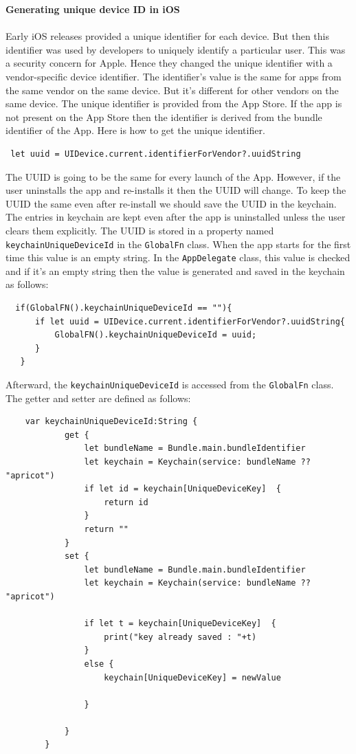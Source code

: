 \documentclass[12pt, conference, a4paper]{article}
\begin{document}
\textbf{Generating unique device ID in iOS\\}\\
Early iOS releases provided a unique identifier for each device. But then this identifier was used by developers to uniquely identify a particular user. This was a security concern for Apple. Hence they changed the unique identifier with a vendor-specific device identifier. The identifier’s value is the same for apps from the same vendor on the same device. But it’s different for other vendors on the same device. The unique identifier is provided from the App Store. If the app is not present on the App Store then the identifier is derived from the bundle identifier of the App. 
Here is how to get the unique identifier. 
\begin{verbatim}
 let uuid = UIDevice.current.identifierForVendor?.uuidString   
\end{verbatim}
The UUID is going to be the same for every launch of the App. However, if the user uninstalls the app and re-installs it then the UUID will change. To keep the UUID the same even after re-install we should save the UUID in the keychain. The entries in keychain are kept even after the app is uninstalled unless the user clears them explicitly. The UUID is stored in a property named \texttt{keychainUniqueDeviceId} in the \texttt{GlobalFn} class. When the app starts for the first time this value is an empty string. In the \texttt{AppDelegate} class, this value is checked and if it’s an empty string then the value is generated and saved in the keychain as follows: 
\begin{verbatim}
  if(GlobalFN().keychainUniqueDeviceId == ""){
      if let uuid = UIDevice.current.identifierForVendor?.uuidString{
          GlobalFN().keychainUniqueDeviceId = uuid;
      }
   }
\end{verbatim}
Afterward, the \texttt{keychainUniqueDeviceId} is accessed from the \texttt{GlobalFn} class. The getter and setter are defined as follows:
\newpage
\begin{verbatim}
    var keychainUniqueDeviceId:String {
            get {
                let bundleName = Bundle.main.bundleIdentifier
                let keychain = Keychain(service: bundleName ?? "apricot")
                if let id = keychain[UniqueDeviceKey]  {
                    return id
                }
                return ""
            }
            set {
                let bundleName = Bundle.main.bundleIdentifier
                let keychain = Keychain(service: bundleName ?? "apricot")
  
                if let t = keychain[UniqueDeviceKey]  {
                    print("key already saved : "+t)
                }
                else {
                    keychain[UniqueDeviceKey] = newValue
  
                }
                
            }
        }
\end{verbatim}
\end{document}

